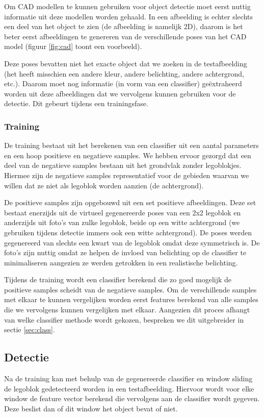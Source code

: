 Om CAD modellen te kunnen gebruiken voor object detectie moet eerst nuttig informatie uit deze modellen worden gehaald. In een afbeelding is echter slechts een deel van het object te zien (de afbeelding is namelijk 2D),  daarom is het beter eerst afbeeldingen te genereren van de verschillende poses van het CAD model (figuur \ref{fig:cad} toont een voorbeeld). 

Deze poses bevatten niet het exacte object dat we zoeken in de testafbeelding (het heeft misschien een andere kleur, andere belichting, andere achtergrond, etc.). Daarom moet nog informatie (in vorm van een classifier) ge\"extraheerd worden uit deze afbeeldingen dat we vervolgens kunnen gebruiken voor de detectie. Dit gebeurt tijdens een trainingsfase.

\subsubsection*{Training}
De training bestaat uit het berekenen van een classifier uit een aantal parameters en een hoop positieve en negatieve samples. We hebben ervoor gezorgd dat een deel van de negatieve samples bestaan uit het grondvlak zonder legoblokjes. Hiermee zijn de negatieve samples representatief voor de gebieden waarvan we willen dat ze niet als legoblok worden aanzien (de achtergrond).

De positieve samples zijn opgebouwd uit een set positieve afbeeldingen. Deze set bestaat enerzijds uit de virtueel gegenereerde poses van een 2x2 legoblok en anderzijds uit foto's van zulke legoblok, beide op een witte achtergrond (we gebruiken tijdens detectie immers ook een witte achtergrond). De poses werden gegenereerd van slechts een kwart van de legoblok omdat deze symmetrisch is. De foto's zijn nuttig omdat ze helpen de invloed van belichting op de classifier te minimaliseren aangezien ze werden getrokken in een realistische belichting. 

Tijdens de training wordt een classifier berekend die zo goed mogelijk de positieve samples scheidt van de negatieve samples. Om de verschillende samples met elkaar te kunnen vergelijken worden eerst features berekend van alle samples die we vervolgens kunnen vergelijken met elkaar. Aangezien dit proces afhangt van welke classifier methode wordt gekozen, bespreken we dit uitgebreider in sectie \ref{sec:class}.

\subsection*{Detectie}
Na de training kan met behulp van de gegenereerde classifier en window sliding de legoblok gedetecteerd worden in een testafbeelding. Hiervoor wordt voor elke window de feature vector berekend die vervolgens aan de classifier wordt gegeven. Deze beslist dan of dit window het object bevat of niet.

